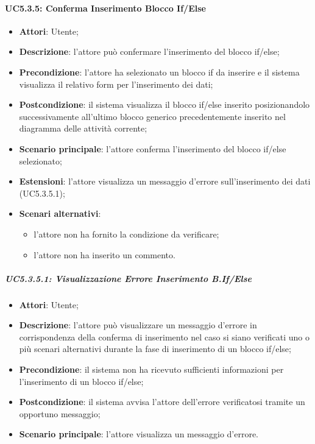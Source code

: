 \paragraph{UC5.3.5: Conferma Inserimento Blocco If/Else}
\label{UC5.3.5}
\begin{itemize}
\item \textbf{Attori}: Utente;
\item \textbf{Descrizione}: l'attore può confermare l'inserimento del blocco if/else;	
\item \textbf{Precondizione}: l'attore ha selezionato un blocco if da inserire e il sistema visualizza il relativo form per l'inserimento dei dati;	
\item \textbf{Postcondizione}: il sistema visualizza il blocco if/else inserito posizionandolo successivamente all'ultimo blocco generico precedentemente inserito nel diagramma delle attività corrente;
\item \textbf{Scenario principale}:
l'attore conferma l'inserimento del blocco if/else selezionato;	
\item \textbf{Estensioni}:
l'attore visualizza un messaggio d'errore sull'inserimento dei dati (UC5.3.5.1);	
\item \textbf{Scenari alternativi}:
\begin{itemize}
\item l'attore non ha fornito la condizione da verificare;
\item l'attore non ha inserito un commento.
\end{itemize}
\end{itemize}

\subparagraph{UC5.3.5.1: Visualizzazione Errore Inserimento B.If/Else}
\label{UC5.3.5.1}
\begin{itemize}
\item \textbf{Attori}: Utente;
\item \textbf{Descrizione}: l'attore può visualizzare un messaggio d'errore in corrispondenza della conferma di inserimento nel caso si siano verificati uno o più scenari alternativi durante la fase di inserimento di un blocco if/else;	
\item \textbf{Precondizione}: il sistema non ha ricevuto sufficienti informazioni per l'inserimento di un blocco if/else;	
\item \textbf{Postcondizione}: il sistema avvisa l'attore dell'errore verificatosi tramite un opportuno messaggio;	
\item \textbf{Scenario principale}:
l'attore visualizza un messaggio d'errore.	
\end{itemize}

